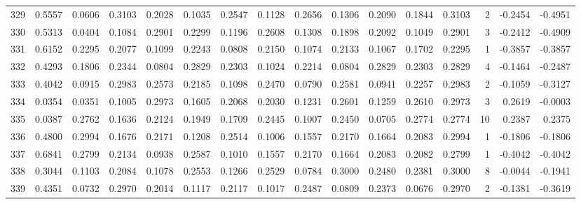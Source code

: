 \begin{tabular}{lrrrrrrrrrrrrrrr}
329 &      0.5557 &  0.0606 &  0.3103 &  0.2028 &  0.1035 &  0.2547 &  0.1128 &  0.2656 &  0.1306 &  0.2090 &   0.1844 &     0.3103 &      2 &                   -0.2454 &                    -0.4951 \\
330 &      0.5313 &  0.0404 &  0.1084 &  0.2901 &  0.2299 &  0.1196 &  0.2608 &  0.1308 &  0.1898 &  0.2092 &   0.1049 &     0.2901 &      3 &                   -0.2412 &                    -0.4909 \\
331 &      0.6152 &  0.2295 &  0.2077 &  0.1099 &  0.2243 &  0.0808 &  0.2150 &  0.1074 &  0.2133 &  0.1067 &   0.1702 &     0.2295 &      1 &                   -0.3857 &                    -0.3857 \\
332 &      0.4293 &  0.1806 &  0.2344 &  0.0804 &  0.2829 &  0.2303 &  0.1024 &  0.2214 &  0.0804 &  0.2829 &   0.2303 &     0.2829 &      4 &                   -0.1464 &                    -0.2487 \\
333 &      0.4042 &  0.0915 &  0.2983 &  0.2573 &  0.2185 &  0.1098 &  0.2470 &  0.0790 &  0.2581 &  0.0941 &   0.2257 &     0.2983 &      2 &                   -0.1059 &                    -0.3127 \\
334 &      0.0354 &  0.0351 &  0.1005 &  0.2973 &  0.1605 &  0.2068 &  0.2030 &  0.1231 &  0.2601 &  0.1259 &   0.2610 &     0.2973 &      3 &                    0.2619 &                    -0.0003 \\
335 &      0.0387 &  0.2762 &  0.1636 &  0.2124 &  0.1949 &  0.1709 &  0.2445 &  0.1007 &  0.2450 &  0.0705 &   0.2774 &     0.2774 &     10 &                    0.2387 &                     0.2375 \\
336 &      0.4800 &  0.2994 &  0.1676 &  0.2171 &  0.1208 &  0.2514 &  0.1006 &  0.1557 &  0.2170 &  0.1664 &   0.2083 &     0.2994 &      1 &                   -0.1806 &                    -0.1806 \\
337 &      0.6841 &  0.2799 &  0.2134 &  0.0938 &  0.2587 &  0.1010 &  0.1557 &  0.2170 &  0.1664 &  0.2083 &   0.2082 &     0.2799 &      1 &                   -0.4042 &                    -0.4042 \\
338 &      0.3044 &  0.1103 &  0.2084 &  0.1078 &  0.2553 &  0.1266 &  0.2529 &  0.0784 &  0.3000 &  0.2480 &   0.2381 &     0.3000 &      8 &                   -0.0044 &                    -0.1941 \\
339 &      0.4351 &  0.0732 &  0.2970 &  0.2014 &  0.1117 &  0.2117 &  0.1017 &  0.2487 &  0.0809 &  0.2373 &   0.0676 &     0.2970 &      2 &                   -0.1381 &                    -0.3619 \\

\end{tabular}

